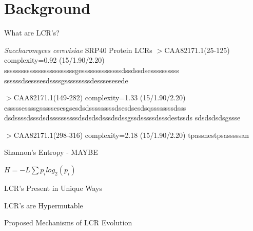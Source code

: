 \documentclass{beamer}
\begin{document}
	\section{Background}
	\begin{frame}{What are LCR's?}
		\label{link1}
		
		\begin{block}{\textit{Saccharomyces cerevisiae} SRP40 Protein LCRs}
			$>$CAA82171.1(25-125) complexity=0.92 (15/1.90/2.20)
			sssssssssssssssssssssssssgessssssssssssssdssdssdsessssssssss
			ssssssdsesssesdssssgsssssssssdesssesesede \newline
			
			$>$CAA82171.1(149-282) complexity=1.33 (15/1.90/2.20)
			esssssessssgsssssesesgsesdsdsssssssssdsesdsesdsqssssssssdsss
			dsdssssdsssdsdssssssssssdsdsdsdsssdsdssgssdsssssdsssdestssds
			sdsdsdsdsgssse \newline
			
			$>$CAA82171.1(298-316) complexity=2.18 (15/1.90/2.20)
			tpassnestpsasssssan
			
		\end{block}		
		
	\end{frame}

	\begin{frame}{Shannon's Entropy - MAYBE }
		
			$H = -L\sum p_i log_2(p_i)$
		
	\end{frame}

	\begin{frame}{LCR's Present in Unique Ways }
	
	
	\end{frame}

	\begin{frame}{LCR's are Hypermutable }
	
	
	\end{frame}

	\begin{frame}{Proposed Mechanisms of LCR Evolution }


	\end{frame}
	
\end{document}
